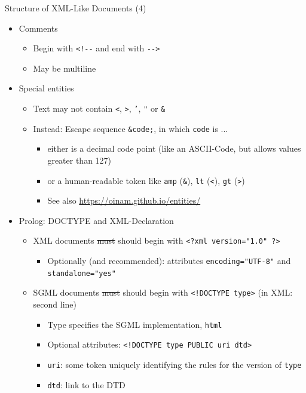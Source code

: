 \begin{frame}{Structure of XML-Like Documents (4)}
%
\begin{itemize}
\item Comments
	\begin{itemize}
	\item Begin with \texttt{<!-{}-} and end with \texttt{-{}->}
	\item May be multiline
	\end{itemize}
\pause
\item Special entities
	\begin{itemize}
	\item Text may not contain \texttt{<}, \texttt{>}, \texttt{'}, \texttt{"} or \texttt{\&}
	\item Instead: Escape sequence \texttt{\&code;}, in which \texttt{code} is ...
		\begin{itemize}
		\item either is a decimal code point (like an ASCII-Code, but allows values greater than 127)
		\item or a human-readable token like \texttt{amp} (\texttt{\&}), \texttt{lt} (\texttt{<}), \texttt{gt} (\texttt{>})
		\item See also \url{https://oinam.github.io/entities/}
		\end{itemize}
	\end{itemize}
\pause
\item Prolog: DOCTYPE and XML-Declaration
	\begin{itemize}
	\item XML documents \sout{must} should begin with \texttt{<?xml version="1.0" ?>}
		\begin{itemize}
		\item Optionally (and recommended): attributes \texttt{encoding="UTF-8"} and \texttt{standalone="yes"}
		\end{itemize}
	\pause
	\item SGML documents \sout{must} should begin with \texttt{<!DOCTYPE type>} (in XML: second line)
		\begin{itemize}
		\item Type specifies the SGML implementation, \zB \texttt{html}
		\item Optional attributes: \texttt{<!DOCTYPE type PUBLIC uri dtd>}
		\item \texttt{uri}: some token uniquely identifying the rules for the version of \texttt{type}
		\item \texttt{dtd}: link to the DTD
		\end{itemize}
	\end{itemize}
\end{itemize}
%
\end{frame}


